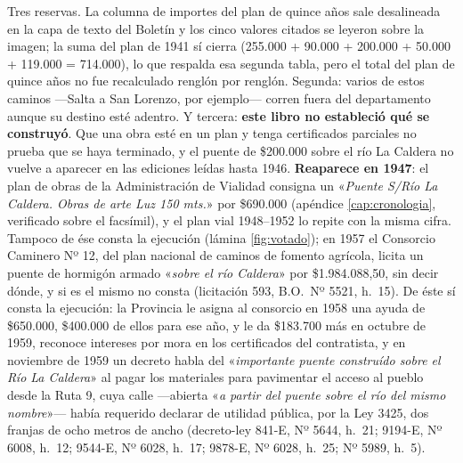\begin{cautela}
Tres reservas. La columna de importes del plan de quince años sale desalineada en la capa de
texto del Boletín y los cinco valores citados se leyeron sobre la imagen; la suma del plan de
1941 sí cierra (255.000 + 90.000 + 200.000 + 50.000 + 119.000 = 714.000), lo que respalda esa
segunda tabla, pero el total del plan de quince años no fue recalculado renglón por renglón.
Segunda: varios de estos caminos ---Salta a San Lorenzo, por ejemplo--- corren fuera del
departamento aunque su destino esté adentro. Y tercera: \textbf{este libro no estableció qué se
construyó}. Que una obra esté en un plan y tenga certificados parciales no prueba que se haya
terminado, y el puente de \$200.000 sobre el río La Caldera no vuelve a aparecer en las
ediciones leídas hasta 1946. \textbf{Reaparece en 1947}: el plan de obras de
la Administración de Vialidad consigna un «\textit{Puente S/Río La Caldera. Obras de arte Luz 150
mts.}» por \$690.000 (apéndice \ref{cap:cronologia}, verificado sobre el facsímil), y el plan
vial 1948--1952 lo repite con la misma cifra. Tampoco de ése consta la ejecución (lámina \ref{fig:votado}); en 1957 el Consorcio Caminero Nº 12, del plan nacional de caminos de fomento agrícola, licita un puente de hormigón armado «\textit{sobre el río Caldera}» por \$1.984.088,50, sin decir dónde, y si es el mismo no consta (licitación 593, B.O.\ Nº 5521, h.\ 15). De éste sí consta la ejecución: la Provincia le asigna al consorcio en 1958 una ayuda de \$650.000, \$400.000 de ellos para ese año, y le da \$183.700 más en octubre de 1959, reconoce intereses por mora en los certificados del contratista, y en noviembre de 1959 un decreto habla del «\textit{importante puente construído sobre el Río La Caldera}» al pagar los materiales para pavimentar el acceso al pueblo desde la Ruta 9, cuya calle ---abierta «\textit{a partir del puente sobre el río del mismo nombre}»--- había requerido declarar de utilidad pública, por la Ley 3425, dos franjas de ocho metros de ancho (decreto-ley 841-E, Nº 5644, h.\ 21; 9194-E, Nº 6008, h.\ 12; 9544-E, Nº 6028, h.\ 17; 9878-E, Nº 6028, h.\ 25; Nº 5989, h.\ 5). 
\end{cautela}

